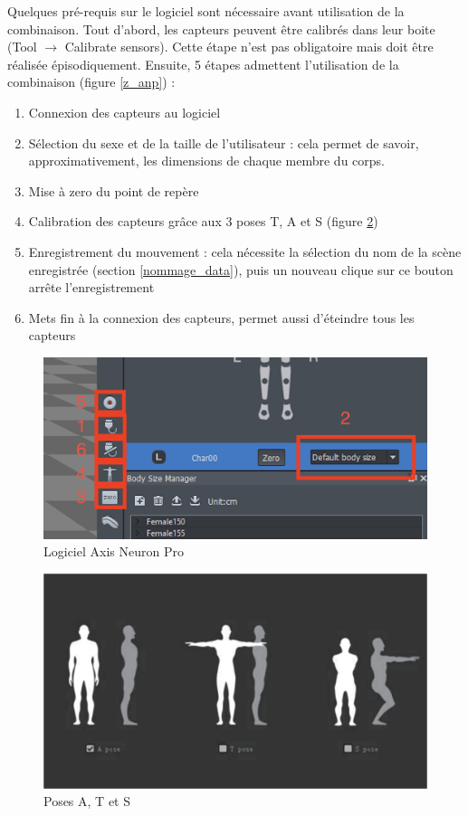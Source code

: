 \documentclass{article}
\begin{document}
Quelques pré-requis sur le logiciel sont nécessaire avant utilisation de la combinaison. Tout d'abord, les capteurs peuvent être calibrés dans leur boite (Tool $\longrightarrow$ Calibrate sensors). Cette étape n'est pas obligatoire mais doit être réalisée épisodiquement. Ensuite, 5 étapes admettent l'utilisation de la combinaison (figure \ref{z_anp}) :
\begin{enumerate}
	\item Connexion des capteurs au logiciel
	\item Sélection du sexe et de la taille de l'utilisateur : cela permet de savoir, approximativement, les dimensions de chaque membre du corps.
	\item Mise à zero du point de repère
	\item Calibration des capteurs grâce aux 3 poses T, A et S (figure \ref{poses})
	\item Enregistrement du mouvement : cela nécessite la sélection du nom de la scène enregistrée (section \ref{nommage_data}), puis un nouveau clique sur ce bouton arrête l'enregistrement
	\item Mets fin à la connexion des capteurs, permet aussi d'éteindre tous les capteurs
\end{enumerate}

\begin{figure}
	\centering
	\includegraphics[scale=0.4]{img/zoom_anp.png}
	\caption{Logiciel Axis Neuron Pro}
	\label{a_n_p}
\end{figure}

\begin{figure}
	\centering
	\includegraphics[scale=0.4]{img/poses.png}
	\caption{Poses A, T et S}
	\label{poses}
\end{figure}
\end{document}
